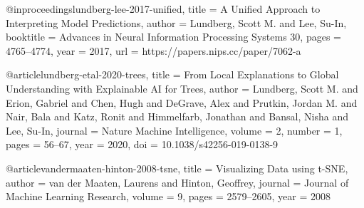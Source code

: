 @inproceedings{lundberg-lee-2017-unified,
    title     = {A Unified Approach to Interpreting Model Predictions},
    author    = {Lundberg, Scott M. and Lee, Su-In},
    booktitle = {Advances in Neural Information Processing Systems 30},
    pages     = {4765--4774},
    year      = {2017},
    url       = {https://papers.nips.cc/paper/7062-a}
}

@article{lundberg-etal-2020-trees,
    title   = {From Local Explanations to Global Understanding with Explainable {AI} for Trees},
    author  = {Lundberg, Scott M. and Erion, Gabriel and Chen, Hugh and DeGrave, Alex and
               Prutkin, Jordan M. and Nair, Bala and Katz, Ronit and Himmelfarb, Jonathan and
               Bansal, Nisha and Lee, Su-In},
    journal = {Nature Machine Intelligence},
    volume  = {2},
    number  = {1},
    pages   = {56--67},
    year    = {2020},
    doi     = {10.1038/s42256-019-0138-9}
}

@article{vandermaaten-hinton-2008-tsne,
    title   = {Visualizing Data using t-{SNE}},
    author  = {van der Maaten, Laurens and Hinton, Geoffrey},
    journal = {Journal of Machine Learning Research},
    volume  = {9},
    pages   = {2579--2605},
    year    = {2008}
}
